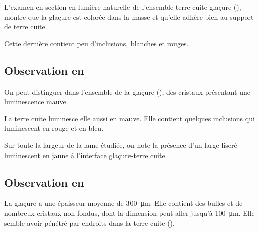 L'examen en section en lumière naturelle de l'ensemble terre 
cuite-glaçure (), montre que la glaçure est 
colorée dans la masse et qu'elle adhère bien au support de terre cuite.

Cette dernière contient peu d'inclusions, blanches et rouges.

\subsection{Observation en \CL}
On peut distinguer dans l'ensemble de la glaçure 
(), des cristaux présentant une 
luminescence mauve.

La terre cuite luminesce elle aussi en mauve. Elle contient quelques 
inclusions qui luminescent en rouge et en bleu.

Sur toute la largeur de la lame étudiée, on note la présence d'un 
large liseré luminescent en jaune à l'interface glaçure-terre cuite.


\subsection{Observation en \MEB[ie]}
La glaçure a une épaisseur moyenne de \SI{300}{\um}. Elle contient 
des bulles et de nombreux cristaux non fondus, dont la dimension peut 
aller jusqu'à \SI{100}{\um}. Elle semble avoir pénétré par endroits 
dans la terre cuite ().


